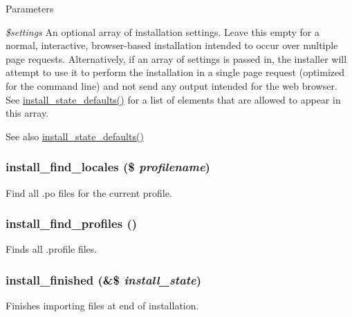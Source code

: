 \begin{DoxyParams}{Parameters}
\item[{\em \$settings}]An optional array of installation settings. Leave this empty for a normal, interactive, browser-\/based installation intended to occur over multiple page requests. Alternatively, if an array of settings is passed in, the installer will attempt to use it to perform the installation in a single page request (optimized for the command line) and not send any output intended for the web browser. See \hyperlink{install_8core_8inc_ab52bef71652d133045e4182da84a33b8}{install\_\-state\_\-defaults()} for a list of elements that are allowed to appear in this array.\end{DoxyParams}
\begin{DoxySeeAlso}{See also}
\hyperlink{install_8core_8inc_ab52bef71652d133045e4182da84a33b8}{install\_\-state\_\-defaults()} 
\end{DoxySeeAlso}
\hypertarget{install_8core_8inc_a2a4848ecf0e42d2782a9b58857e6476b}{
\subsubsection[{install\_\-find\_\-locales}]{\setlength{\rightskip}{0pt plus 5cm}install\_\-find\_\-locales (\$ {\em profilename})}}
\label{install_8core_8inc_a2a4848ecf0e42d2782a9b58857e6476b}
Find all .po files for the current profile. \hypertarget{install_8core_8inc_a0b98c0d4c34d20f6334cc0f609c65ac8}{
\subsubsection[{install\_\-find\_\-profiles}]{\setlength{\rightskip}{0pt plus 5cm}install\_\-find\_\-profiles ()}}
\label{install_8core_8inc_a0b98c0d4c34d20f6334cc0f609c65ac8}
Finds all .profile files. \hypertarget{install_8core_8inc_abd023c5f3e8348d02d2667ed5648a0fb}{
\subsubsection[{install\_\-finished}]{\setlength{\rightskip}{0pt plus 5cm}install\_\-finished (\&\$ {\em install\_\-state})}}
\label{install_8core_8inc_abd023c5f3e8348d02d2667ed5648a0fb}
Finishes importing files at end of installation.


